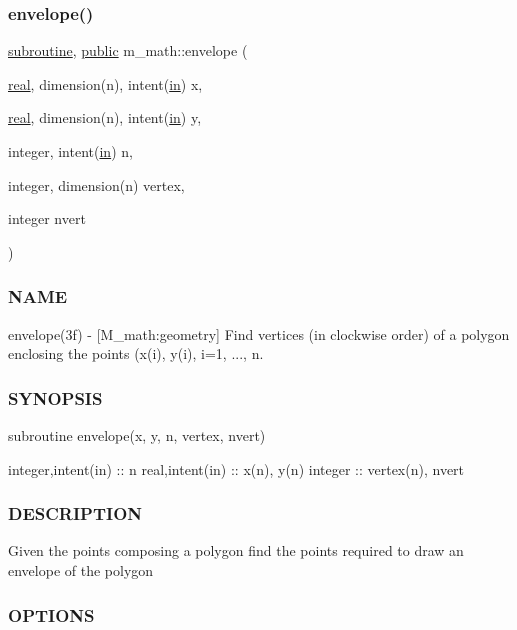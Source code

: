 \subsubsection{\texorpdfstring{envelope()}{envelope()}}
{\footnotesize\ttfamily \hyperlink{M__stopwatch_83_8txt_acfbcff50169d691ff02d4a123ed70482}{subroutine}, \hyperlink{M__stopwatch_83_8txt_a2f74811300c361e53b430611a7d1769f}{public} m\+\_\+math\+::envelope (\begin{DoxyParamCaption}\item[{\hyperlink{read__watch_83_8txt_abdb62bde002f38ef75f810d3a905a823}{real}, dimension(n), intent(\hyperlink{M__journal_83_8txt_afce72651d1eed785a2132bee863b2f38}{in})}]{x,  }\item[{\hyperlink{read__watch_83_8txt_abdb62bde002f38ef75f810d3a905a823}{real}, dimension(n), intent(\hyperlink{M__journal_83_8txt_afce72651d1eed785a2132bee863b2f38}{in})}]{y,  }\item[{integer, intent(\hyperlink{M__journal_83_8txt_afce72651d1eed785a2132bee863b2f38}{in})}]{n,  }\item[{integer, dimension(n)}]{vertex,  }\item[{integer}]{nvert }\end{DoxyParamCaption})}



\subsubsection*{N\+A\+ME}

envelope(3f) -\/ \mbox{[}M\+\_\+math\+:geometry\mbox{]} Find vertices (in clockwise order) of a polygon enclosing the points (x(i), y(i), i=1, ..., n. \subsubsection*{S\+Y\+N\+O\+P\+S\+IS}

subroutine envelope(x, y, n, vertex, nvert)

integer,intent(in) \+:\+: n real,intent(in) \+:\+: x(n), y(n) integer \+:\+: vertex(n), nvert

\subsubsection*{D\+E\+S\+C\+R\+I\+P\+T\+I\+ON}

Given the points composing a polygon find the points required to draw an envelope of the polygon

\subsubsection*{O\+P\+T\+I\+O\+NS}

